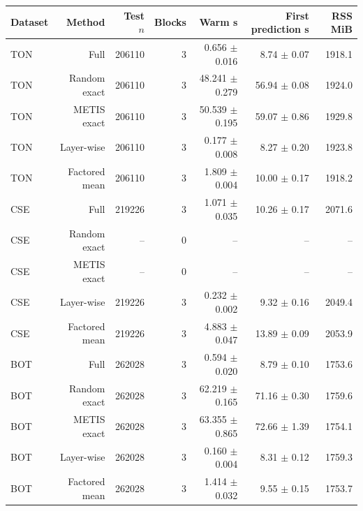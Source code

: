 \begin{tabular}{lrrrrrr}
\toprule
Dataset & Method & Test $n$ & Blocks & Warm s & First prediction s & RSS MiB \\
\midrule
TON & Full & 206110 & 3 & 0.656 $\pm$ 0.016 & 8.74 $\pm$ 0.07 & 1918.1 \\
TON & Random exact & 206110 & 3 & 48.241 $\pm$ 0.279 & 56.94 $\pm$ 0.08 & 1924.0 \\
TON & METIS exact & 206110 & 3 & 50.539 $\pm$ 0.195 & 59.07 $\pm$ 0.86 & 1929.8 \\
TON & Layer-wise & 206110 & 3 & 0.177 $\pm$ 0.008 & 8.27 $\pm$ 0.20 & 1923.8 \\
TON & Factored mean & 206110 & 3 & 1.809 $\pm$ 0.004 & 10.00 $\pm$ 0.17 & 1918.2 \\
CSE & Full & 219226 & 3 & 1.071 $\pm$ 0.035 & 10.26 $\pm$ 0.17 & 2071.6 \\
CSE & Random exact & -- & 0 & -- & -- & -- \\
CSE & METIS exact & -- & 0 & -- & -- & -- \\
CSE & Layer-wise & 219226 & 3 & 0.232 $\pm$ 0.002 & 9.32 $\pm$ 0.16 & 2049.4 \\
CSE & Factored mean & 219226 & 3 & 4.883 $\pm$ 0.047 & 13.89 $\pm$ 0.09 & 2053.9 \\
BOT & Full & 262028 & 3 & 0.594 $\pm$ 0.020 & 8.79 $\pm$ 0.10 & 1753.6 \\
BOT & Random exact & 262028 & 3 & 62.219 $\pm$ 0.165 & 71.16 $\pm$ 0.30 & 1759.6 \\
BOT & METIS exact & 262028 & 3 & 63.355 $\pm$ 0.865 & 72.66 $\pm$ 1.39 & 1754.1 \\
BOT & Layer-wise & 262028 & 3 & 0.160 $\pm$ 0.004 & 8.31 $\pm$ 0.12 & 1759.3 \\
BOT & Factored mean & 262028 & 3 & 1.414 $\pm$ 0.032 & 9.55 $\pm$ 0.15 & 1753.7 \\
\bottomrule
\end{tabular}
